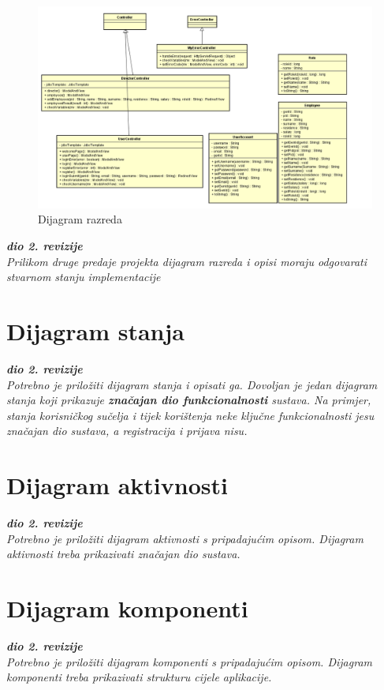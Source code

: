 			
			\begin{figure}[H]
				\includegraphics[scale=0.58]{slike/DijagramRazredaAlfa.png} %
				\centering
				\caption{Dijagram razreda}
				\label{DR1}
			\end{figure}
		
		
		
			
			\textbf{\textit{dio 2. revizije}}\\			
			
			\textit{Prilikom druge predaje projekta dijagram razreda i opisi moraju odgovarati stvarnom stanju implementacije}
			
			
			
			\eject
		
		\section{Dijagram stanja}
			
			
			\textbf{\textit{dio 2. revizije}}\\
			
			\textit{Potrebno je priložiti dijagram stanja i opisati ga. Dovoljan je jedan dijagram stanja koji prikazuje \textbf{značajan dio funkcionalnosti} sustava. Na primjer, stanja korisničkog sučelja i tijek korištenja neke ključne funkcionalnosti jesu značajan dio sustava, a registracija i prijava nisu. }
			
			
			\eject 
		
		\section{Dijagram aktivnosti}
			
			\textbf{\textit{dio 2. revizije}}\\
			
			 \textit{Potrebno je priložiti dijagram aktivnosti s pripadajućim opisom. Dijagram aktivnosti treba prikazivati značajan dio sustava.}
			
			\eject
		\section{Dijagram komponenti}
		
			\textbf{\textit{dio 2. revizije}}\\
		
			 \textit{Potrebno je priložiti dijagram komponenti s pripadajućim opisom. Dijagram komponenti treba prikazivati strukturu cijele aplikacije.}